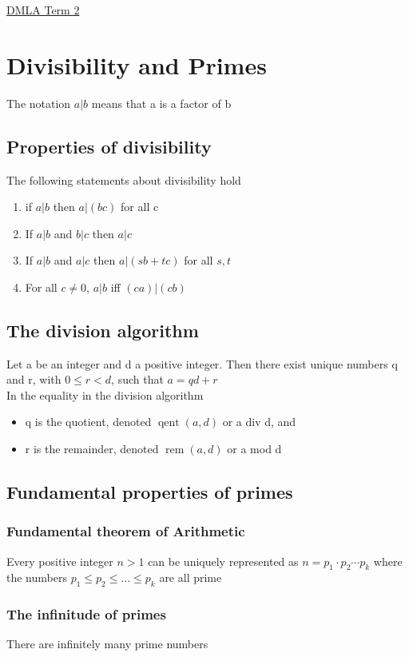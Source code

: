 \documentclass{article}[18pt]
\begin{document}
\begin{center}
\underline{\huge DMLA Term 2}
\end{center}
\section{Divisibility and Primes}
The notation $a|b$ means that a is a factor of b
\subsection{Properties of divisibility}
The following statements about divisibility hold
\begin{enumerate}
	\item if $a|b$ then $a|(bc)$ for all c
	\item If $a|b$ and $b|c$ then $a|c$
	\item If $a|b$ and $a|c$ then $a|(sb+tc)$ for all $s,t$
	\item For all $c\neq 0$, $a|b$ iff $(ca)|(cb)$
\end{enumerate}
\subsection{The division algorithm}
Let a be an integer and d a positive integer. Then there exist unique numbers q and r, with $0\leqslant r<d$, such that $a=qd+r$\\
In the equality in the division algorithm
\begin{itemize}
	\item q is the quotient, denoted $\operatorname{qent}(a,d)$ or a div d, and
	\item r is the remainder, denoted $\operatorname{rem}(a,d)$ or a mod d
\end{itemize}
\subsection{Fundamental properties of primes}
\subsubsection{Fundamental theorem of Arithmetic}
Every positive integer $n>1$ can be uniquely represented as $n=p_1\cdot p_2 \cdots p_k$ where the numbers $p_1\leqslant p_2\leqslant\ldots \leqslant p_k$ are all prime
\subsubsection{The infinitude of primes}
There are infinitely many prime numbers
\end{document}
